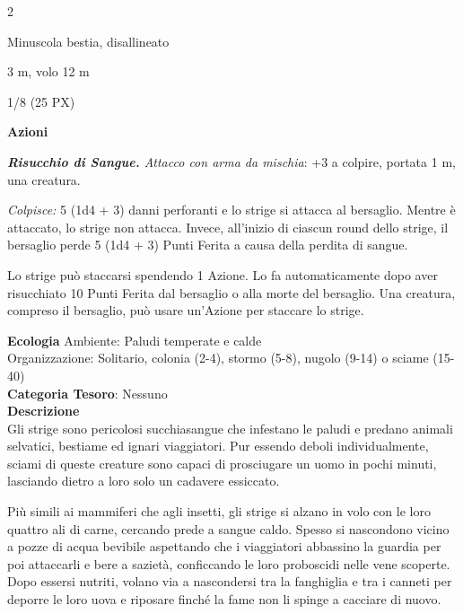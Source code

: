 \begin{multicols}{2}
{
\begin{description}[noitemsep, topsep=0pt, parsep=0pt, partopsep=0pt, itemsep=1pt, leftmargin=2.35cm,  labelwidth=2.2cm, itemindent=0cm, listparindent=0pt] %
\setlength{\baselineskip}{10pt}
\item[\textbf{Taglia/Tipo}] Minuscola bestia, disallineato
\item[\textbf{Caratt.}] 
\item[\textbf{Punti Ferita}] 
\item[\textbf{Movimento}] 3 m, volo 12 m
\item[\textbf{Tiri Salvez.}] 
\item[\textbf{Sensi}] 
\item[\textbf{Sfida}] 1/8 (25 PX)
\end{description}
\smallskip

\textbf{Azioni}

\emph{\textbf{Risucchio di Sangue.} Attacco con arma da mischia}: +3 a colpire, portata 1 m, una creatura.

\emph{Colpisce:} 5 (1d4 + 3) danni perforanti e lo strige si attacca al bersaglio. Mentre è attaccato, lo strige non attacca. Invece, all'inizio di ciascun round dello strige, il bersaglio perde 5 (1d4 + 3) Punti Ferita a causa della perdita di sangue.

Lo strige può staccarsi spendendo 1 Azione. Lo fa automaticamente dopo aver risucchiato 10 Punti Ferita dal bersaglio o alla morte del bersaglio. Una creatura, compreso il bersaglio, può usare un'Azione per staccare lo strige.

\textbf{Ecologia}
Ambiente: Paludi temperate e calde\\
Organizzazione: Solitario, colonia (2-4), stormo (5-8), nugolo (9-14) o sciame (15-40)\\
\textbf{Categoria Tesoro}: Nessuno\\
\textbf{Descrizione}\\
Gli strige sono pericolosi succhiasangue che infestano le paludi e predano animali selvatici, bestiame ed ignari viaggiatori. Pur essendo deboli individualmente, sciami di queste creature sono capaci di prosciugare un uomo in pochi minuti, lasciando dietro a loro solo un cadavere essiccato.

Più simili ai mammiferi che agli insetti, gli strige si alzano in volo con le loro quattro ali di carne, cercando prede a sangue caldo. Spesso si nascondono vicino a pozze di acqua bevibile aspettando che i viaggiatori abbassino la guardia per poi attaccarli e bere a sazietà, conficcando le loro proboscidi nelle vene scoperte. Dopo essersi nutriti, volano via a nascondersi tra la fanghiglia e tra i canneti per deporre le loro uova e riposare finché la fame non li spinge a cacciare di nuovo.

}
\end{multicols}
